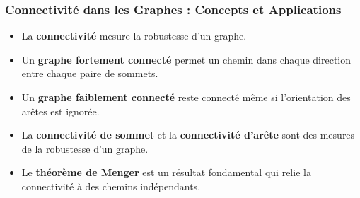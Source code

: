\begin{frame}
\frametitle{Connectivité dans les Graphes : Concepts et Applications}
\begin{itemize}
    \item La \textbf{connectivité} mesure la robustesse d'un graphe.
    \item Un \textbf{graphe fortement connecté} permet un chemin dans chaque direction entre chaque paire de sommets.
    \item Un \textbf{graphe faiblement connecté} reste connecté même si l'orientation des arêtes est ignorée.
    \item La \textbf{connectivité de sommet} et la \textbf{connectivité d'arête} sont des mesures de la robustesse d'un graphe.
    \item Le \textbf{théorème de Menger} est un résultat fondamental qui relie la connectivité à des chemins indépendants.
\end{itemize}
\end{frame}